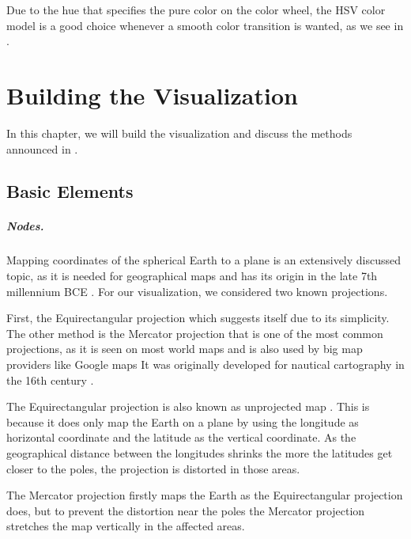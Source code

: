 \documentclass
[
    paper = a4,
    pagesize,
    12 pt,
    oneside,                       %
    open = right,
    DIV = calc,
    BCOR = 0 mm,                   %
    bibtotoc
]
{scrbook}
\begin{document}
Due to the hue that specifies the pure color on the color wheel, the HSV color model is a good choice whenever a smooth color transition is wanted, as we see in  .

\chapter{Building the Visualization} \label{main}

In this chapter, we will build the visualization and discuss the methods announced in .

\section{Basic Elements} \label{graph}

\paragraph{Nodes.}
Mapping coordinates of the spherical Earth to a plane is an extensively discussed topic, as it is needed for geographical maps and has its origin in the late 7th millennium BCE \cite{wiki:cartography}.
For our visualization, we considered two known projections.

First, the Equirectangular projection which suggests itself due to its simplicity.
The other method is the Mercator projection that is one of the most common projections, as it is seen on most world maps and is also used by big map providers like Google maps \cite{google_maps}
It was originally developed for nautical cartography in the 16th century \cite{mercator}.

The Equirectangular projection is also known as unprojected map \cite{equirectangular}.
This is because it does only map the Earth on a plane by using the longitude as horizontal coordinate and the latitude as the vertical coordinate.
As the geographical distance between the longitudes shrinks the more the latitudes get closer to the poles, the projection is distorted in those areas.

The Mercator projection firstly maps the Earth as the Equirectangular projection does, but to prevent the distortion near the poles the Mercator projection stretches the map vertically in the affected areas.
\end{document}
